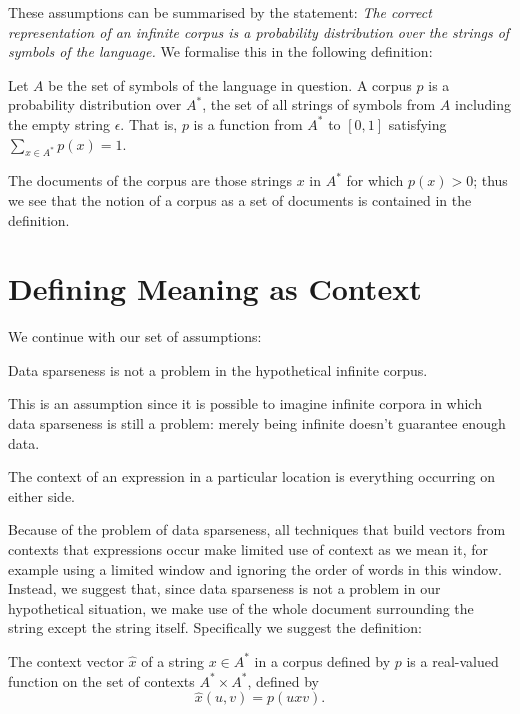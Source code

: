 \documentclass[12pt]{report}
\begin{document}
These assumptions can be summarised by the statement: \emph{The correct representation of an infinite corpus is a probability distribution over the strings of symbols of the language.}
We formalise this in the following definition:
\begin{defn}[Corpus]
Let $A$ be the set of symbols of the language in question. A corpus $p$ is a probability distribution over $A^*$, the set of all strings of symbols from $A$ including the empty string $\epsilon$. That is, $p$ is a function from $A^*$ to $[0,1]$ satisfying $\sum_{x\in A^*} p(x) = 1$.
\end{defn}
The documents of the corpus are those strings $x$ in $A^*$ for which $p(x) > 0$; thus we see that the notion of a corpus as a set of documents is contained in the definition.

\section{Defining Meaning as Context}

We continue with our set of assumptions:

\begin{assumption} Data sparseness is not a problem in the hypothetical infinite corpus.\end{assumption} \noindent
This is an assumption since it is possible to imagine infinite corpora in which data sparseness is still a problem: merely being infinite doesn't guarantee enough data.

\begin{assumption} The context of an expression in a particular location is everything occurring on either side.\end{assumption} \noindent
 Because of the problem of data sparseness, all techniques that build vectors from contexts that expressions occur make limited use of context as we mean it, for example using a limited window and ignoring the order of words in this window. Instead, we suggest that, since data sparseness is not a problem in our hypothetical situation, we make use of the whole document surrounding the string except the string itself. Specifically we suggest the definition:
\begin{defn}
The context vector $\hat{x}$ of a string $x \in A^*$ in a corpus defined by $p$ is a real-valued function on the set of contexts $A^* \times A^*$, defined by
$$\hat{x}(u,v) = p(uxv).$$
\end{defn}

 
\end{document}
